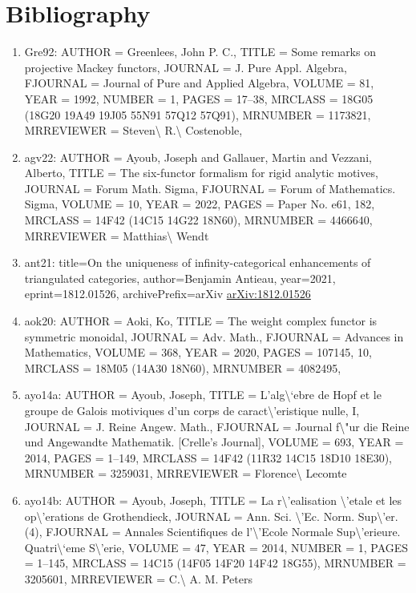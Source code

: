 \documentclass[11pt]{article}
\begin{document}
\section*{Bibliography}
\begin{enumerate}[leftmargin=*]
  \item Gre92: AUTHOR = Greenlees, John P. C., TITLE = Some remarks on projective Mackey functors, JOURNAL = J. Pure Appl. Algebra, FJOURNAL = Journal of Pure and Applied Algebra, VOLUME = 81, YEAR = 1992, NUMBER = 1, PAGES = 17--38, MRCLASS = 18G05 (18G20 19A49 19J05 55N91 57Q12 57Q91), MRNUMBER = 1173821, MRREVIEWER = Steven\textbackslash{} R.\textbackslash{} Costenoble,
  \item agv22: AUTHOR = Ayoub, Joseph and Gallauer, Martin and Vezzani, Alberto, TITLE = The six-functor formalism for rigid analytic motives, JOURNAL = Forum Math. Sigma, FJOURNAL = Forum of Mathematics. Sigma, VOLUME = 10, YEAR = 2022, PAGES = Paper No. e61, 182, MRCLASS = 14F42 (14C15 14G22 18N60), MRNUMBER = 4466640, MRREVIEWER = Matthias\textbackslash{} Wendt
  \item ant21: title=On the uniqueness of infinity-categorical enhancements of triangulated categories, author=Benjamin Antieau, year=2021, eprint=1812.01526, archivePrefix=arXiv \href{https://arxiv.org/abs/1812.01526}{arXiv:1812.01526}
  \item aok20: AUTHOR = Aoki, Ko, TITLE = The weight complex functor is symmetric monoidal, JOURNAL = Adv. Math., FJOURNAL = Advances in Mathematics, VOLUME = 368, YEAR = 2020, PAGES = 107145, 10, MRCLASS = 18M05 (14A30 18N60), MRNUMBER = 4082495,
  \item ayo14a: AUTHOR = Ayoub, Joseph, TITLE = L'alg\textbackslash{}`ebre de Hopf et le groupe de Galois motiviques d'un corps de caract\textbackslash{}'eristique nulle, I, JOURNAL = J. Reine Angew. Math., FJOURNAL = Journal f\textbackslash{}"ur die Reine und Angewandte Mathematik. [Crelle's Journal], VOLUME = 693, YEAR = 2014, PAGES = 1--149, MRCLASS = 14F42 (11R32 14C15 18D10 18E30), MRNUMBER = 3259031, MRREVIEWER = Florence\textbackslash{} Lecomte
  \item ayo14b: AUTHOR = Ayoub, Joseph, TITLE = La r\textbackslash{}'ealisation \textbackslash{}'etale et les op\textbackslash{}'erations de Grothendieck, JOURNAL = Ann. Sci. \textbackslash{}'Ec. Norm. Sup\textbackslash{}'er. (4), FJOURNAL = Annales Scientifiques de l'\textbackslash{}'Ecole Normale Sup\textbackslash{}'erieure. Quatri\textbackslash{}`eme S\textbackslash{}'erie, VOLUME = 47, YEAR = 2014, NUMBER = 1, PAGES = 1--145, MRCLASS = 14C15 (14F05 14F20 14F42 18G55), MRNUMBER = 3205601, MRREVIEWER = C.\textbackslash{} A. M. Peters

\end{enumerate}
\end{document}
